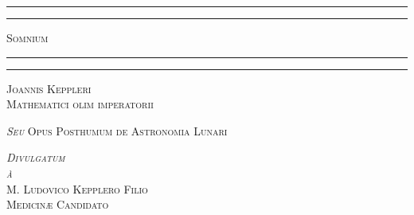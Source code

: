 \documentclass[a4paper, 11pt, oneside, polutonikogreek, german]{article}
\begin{document}
\begin{titlepage} %
	\centering %


	\rule{\textwidth}{1.6pt}\vspace*{-\baselineskip}\vspace*{2pt} %
	\rule{\textwidth}{0.4pt} %
	
	\vspace{1\baselineskip} %
	
	{\scshape\Huge Somnium}
	
	\vspace{1\baselineskip} %

	\rule{\textwidth}{0.4pt}\vspace*{-\baselineskip}\vspace{3.2pt} %
	\rule{\textwidth}{1.6pt} %
	
	\vspace{1\baselineskip} %
	
	
	{\scshape \Large Joannis Keppleri\\\large Mathematici olim imperatorii }
 
        \vspace{0.5\baselineskip}

        {\scshape \normalsize \emph{Seu} Opus Posthumum de Astronomia Lunari}

        \vspace{0.5\baselineskip}
        
        {\scshape \small \emph{Divulgatum}\\ \emph{à} \\M. Ludovico Kepplero Filio\\ Medicinæ Candidato} %
	
	\vspace*{1\baselineskip} %
	
        {\scshape \normalsize } %


\end{titlepage}
\end{document}
